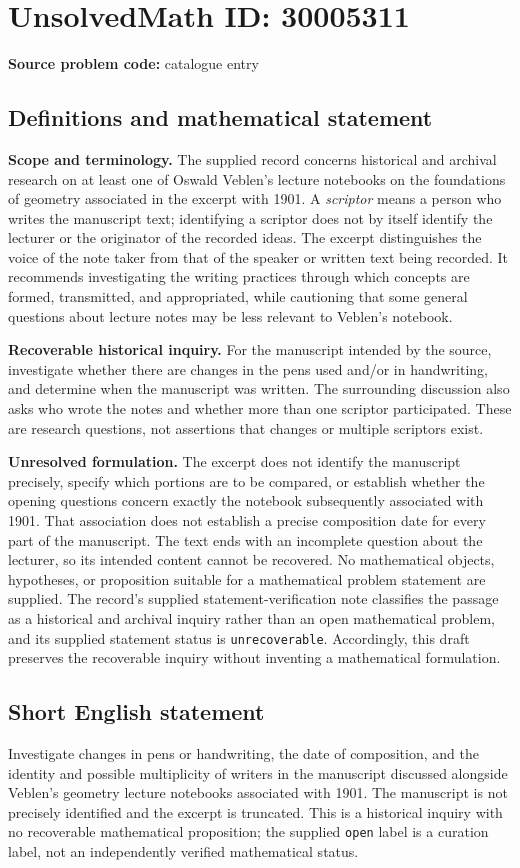 \documentclass[11pt]{article}
\begin{document}
\section*{UnsolvedMath ID: 30005311}
\textbf{Source problem code:} catalogue entry
\subsection{Definitions and mathematical statement}
\textbf{Scope and terminology.} The supplied record concerns historical and archival research on at least one of Oswald Veblen's lecture notebooks on the foundations of geometry associated in the excerpt with 1901. A \emph{scriptor} means a person who writes the manuscript text; identifying a scriptor does not by itself identify the lecturer or the originator of the recorded ideas. The excerpt distinguishes the voice of the note taker from that of the speaker or written text being recorded. It recommends investigating the writing practices through which concepts are formed, transmitted, and appropriated, while cautioning that some general questions about lecture notes may be less relevant to Veblen's notebook.

\textbf{Recoverable historical inquiry.} For the manuscript intended by the source, investigate whether there are changes in the pens used and/or in handwriting, and determine when the manuscript was written. The surrounding discussion also asks who wrote the notes and whether more than one scriptor participated. These are research questions, not assertions that changes or multiple scriptors exist.

\textbf{Unresolved formulation.} The excerpt does not identify the manuscript precisely, specify which portions are to be compared, or establish whether the opening questions concern exactly the notebook subsequently associated with 1901. That association does not establish a precise composition date for every part of the manuscript. The text ends with an incomplete question about the lecturer, so its intended content cannot be recovered. No mathematical objects, hypotheses, or proposition suitable for a mathematical problem statement are supplied. The record's supplied statement-verification note classifies the passage as a historical and archival inquiry rather than an open mathematical problem, and its supplied statement status is \texttt{unrecoverable}. Accordingly, this draft preserves the recoverable inquiry without inventing a mathematical formulation.
\subsection{Short English statement}
Investigate changes in pens or handwriting, the date of composition, and the identity and possible multiplicity of writers in the manuscript discussed alongside Veblen's geometry lecture notebooks associated with 1901. The manuscript is not precisely identified and the excerpt is truncated. This is a historical inquiry with no recoverable mathematical proposition; the supplied \texttt{open} label is a curation label, not an independently verified mathematical status.
\end{document}
